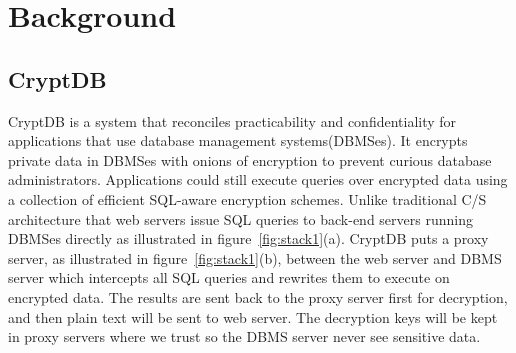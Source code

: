 \section{Background}

\subsection{CryptDB}
CryptDB is a system that reconciles practicability and confidentiality for applications that use database management systems(DBMSes). 
It encrypts private data in DBMSes with onions of encryption to prevent curious database administrators. 
Applications could still execute queries over encrypted data using a collection of efficient SQL-aware encryption schemes. 
Unlike traditional C/S architecture that web servers issue SQL queries to back-end servers running DBMSes directly as illustrated in figure~\ref{fig:stack1}(a). 
CryptDB puts a proxy server, as illustrated in figure~\ref{fig:stack1}(b), between the web server and DBMS server which intercepts all SQL queries and rewrites them to execute on encrypted data. 
The results are sent back to the proxy server first for decryption, and then plain text will be sent to web server. 
The decryption keys will be kept in proxy servers where we trust so the DBMS server never see sensitive data.





